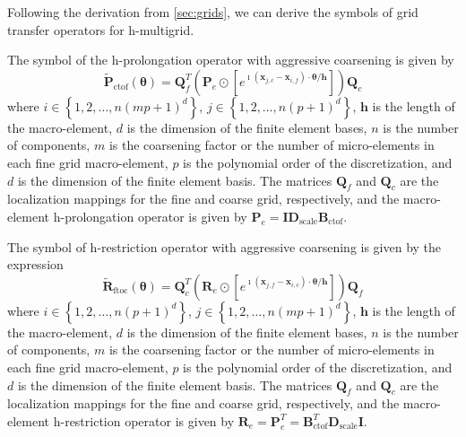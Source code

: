 \documentclass[review]{siamart190516}
\begin{document}
Following the derivation from \cref{sec:grids}, we can derive the symbols of grid transfer operators for h-multigrid.

\begin{definition}\label{def:h_prolongation_symbol}
The symbol of the h-prolongation operator with aggressive coarsening is given by
\begin{equation}
\tilde{\mathbf{P}}_{\text{ctof}} \left( \boldsymbol{\theta} \right) = \mathbf{Q}_f^T \left( \mathbf{P}_e \odot \left[ e^{\imath \left( \mathbf{x}_{j, c} - \mathbf{x}_{i, f} \right) \cdot \mathbf{\theta} / \mathbf{h}} \right] \right) \mathbf{Q}_c
\end{equation}
where $i \in \left\lbrace 1, 2, \dots, n \left( m p + 1 \right)^d \right\rbrace$, $j \in \left\lbrace 1, 2, \dots, n \left( p + 1 \right)^d \right\rbrace$, $\mathbf{h}$ is the length of the macro-element, $d$ is the dimension of the finite element bases, $n$ is the number of components, $m$ is the coarsening factor or the number of micro-elements in each fine grid macro-element, $p$ is the polynomial order of the discretization, and $d$ is the dimension of the finite element basis.
The matrices $\mathbf{Q}_f$ and $\mathbf{Q}_c$ are the localization mappings for the fine and coarse grid, respectively, and the macro-element h-prolongation operator is given by $\mathbf{P}_e = \mathbf{I} \mathbf{D}_{\text{scale}} \mathbf{B}_{\text{ctof}}$.
\end{definition}

\begin{definition}\label{def:h_restriction_symbol}
The symbol of h-restriction operator with aggressive coarsening is given by the expression
\begin{equation}
\tilde{\mathbf{R}}_{\text{ftoc}} \left( \boldsymbol{\theta} \right) = \mathbf{Q}_c^T \left( \mathbf{R}_e \odot \left[ e^{\imath \left( \mathbf{x}_{j, f} - \mathbf{x}_{i, c} \right) \cdot \boldsymbol{\theta} / \mathbf{h}} \right] \right) \mathbf{Q}_f
\end{equation}
where $i \in \left\lbrace 1, 2, \dots, n \left( p + 1 \right)^d \right\rbrace$, $j \in \left\lbrace 1, 2, \dots, n \left( m p + 1 \right)^d \right\rbrace$, $\mathbf{h}$ is the length of the macro-element, $d$ is the dimension of the finite element bases, $n$ is the number of components, $m$ is the coarsening factor or  the number of micro-elements in each fine grid macro-element, $p$ is the polynomial order of the discretization, and $d$ is the dimension of the finite element basis.
The matrices $\mathbf{Q}_f$ and $\mathbf{Q}_c$ are the localization mappings for the fine and coarse grid, respectively, and the macro-element h-restriction operator is given by $\mathbf{R}_e = \mathbf{P}_e^T = \mathbf{B}_{\text{ctof}}^T \mathbf{D}_{\text{scale}} \mathbf{I}$.
\end{definition}
\end{document}

